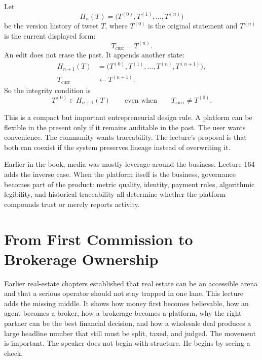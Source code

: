 \documentclass[11pt,oneside]{book}
\begin{document}
Let
\[
H_n(T)=\bigl(T^{(0)},T^{(1)},\dots,T^{(n)}\bigr)
\]
be the version history of tweet \(T\), where \(T^{(0)}\) is the original statement and \(T^{(n)}\) is the current displayed form:
\[
T_{\mathrm{curr}}=T^{(n)}.
\]
An edit does not erase the past. It appends another state:
\begin{align}
H_{n+1}(T) &= \bigl(T^{(0)},T^{(1)},\dots,T^{(n)},T^{(n+1)}\bigr),\\
T_{\mathrm{curr}} &\leftarrow T^{(n+1)}.
\end{align}
So the integrity condition is
\[
T^{(0)}\in H_{n+1}(T)
\qquad
\text{even when}
\qquad
T_{\mathrm{curr}}\neq T^{(0)}.
\]

This is a compact but important entrepreneurial design rule. A platform can be flexible in the present only if it remains auditable in the past. The user wants convenience. The community wants traceability. The lecture's proposal is that both can coexist if the system preserves lineage instead of overwriting it.

\begin{remark}
Earlier in the book, media was mostly leverage around the business. Lecture 164 adds the inverse case. When the platform itself is the business, governance becomes part of the product: metric quality, identity, payment rules, algorithmic legibility, and historical traceability all determine whether the platform compounds trust or merely reports activity.
\end{remark}


\chapter{From First Commission to Brokerage Ownership}

Earlier real-estate chapters established that real estate can be an accessible arena and that a serious operator should not stay trapped in one lane. This lecture adds the missing middle. It shows how money first becomes believable, how an agent becomes a broker, how a brokerage becomes a platform, why the right partner can be the best financial decision, and how a wholesale deal produces a large headline number that still must be split, taxed, and judged. The movement is important. The speaker does not begin with structure. He begins by seeing a check.
\end{document}
